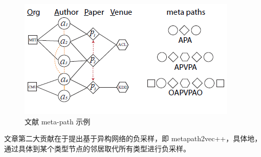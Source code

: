 \documentclass{bmvc2k}
\begin{document}
\begin{figure}[htb]
	\begin{center}
		\includegraphics{images/metapath.png}
	\end{center}
	\caption{文献 meta-path 示例}
	\label{fig:teaser}
\end{figure}


%
文章第二大贡献在于提出基于异构网络的负采样，即 metapath2vec++，具体地，通过具体到某个类型节点的邻居取代所有类型进行负采样。
%
%
\end{document}
